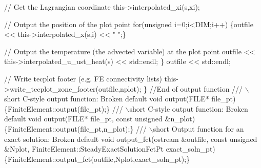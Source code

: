 \begin{DoxyCodeInclude}
     \textcolor{comment}{// Get the Lagrangian coordinate}
     this->interpolated\_xi(s,xi);

     \textcolor{comment}{// Output the position of the plot point}
     \textcolor{keywordflow}{for}(\textcolor{keywordtype}{unsigned} i=0;i<DIM;i++) 
      \{outfile << this->interpolated\_x(s,i) << \textcolor{stringliteral}{" "};\}

     \textcolor{comment}{// Output the temperature (the advected variable) at the plot point}
     outfile << this->interpolated\_u\_ust\_heat(s) << std::endl;   
    \}
   outfile << std::endl;
   
   \textcolor{comment}{// Write tecplot footer (e.g. FE connectivity lists)}
   this->write\_tecplot\_zone\_footer(outfile,nplot);
  \} \textcolor{comment}{//End of output function}
\textcolor{comment}{}
\textcolor{comment}{ /// \(\backslash\)short C-style output function: Broken default}
\textcolor{comment}{} \textcolor{keywordtype}{void} output(FILE* file\_pt)
  \{FiniteElement::output(file\_pt);\}
\textcolor{comment}{}
\textcolor{comment}{ ///  \(\backslash\)short C-style output function: Broken default}
\textcolor{comment}{} \textcolor{keywordtype}{void} output(FILE* file\_pt, \textcolor{keyword}{const} \textcolor{keywordtype}{unsigned} &n\_plot)
  \{FiniteElement::output(file\_pt,n\_plot);\}
\textcolor{comment}{}
\textcolor{comment}{ /// \(\backslash\)short Output function for an exact solution: Broken default}
\textcolor{comment}{} \textcolor{keywordtype}{void} output\_fct(ostream &outfile, \textcolor{keyword}{const} \textcolor{keywordtype}{unsigned} &Nplot,
                 FiniteElement::SteadyExactSolutionFctPt 
                 exact\_soln\_pt)
  \{FiniteElement::output\_fct(outfile,Nplot,exact\_soln\_pt);\}


\end{DoxyCodeInclude}
